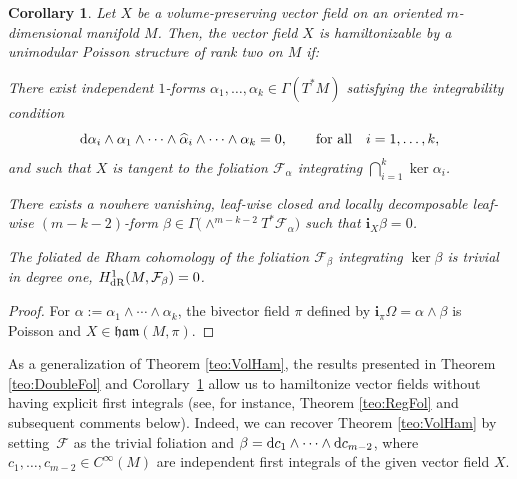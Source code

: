 \documentclass[10pt,a4paper]{amsart}
\newcommand{\dd}{{\rm d}}
\newcommand{\ii}{\mathbf{i}}
\numberwithin{equation}{section}
\newtheorem{Corollary}[Theorem]{Corollary}
\begin{document}
\begin{Corollary}\label{cor:DoubleFol}
Let $X$ be a volume-preserving vector field on an oriented $m$-dimensional mani\-fold $M$. Then, the vector field $X$ is hamiltonizable by a unimodular Poisson structure of rank two on $M$ if:
 \begin{enumerate}\itemsep=0pt
 \item[$1.$] There exist independent $1$-forms $\alpha_1,\dots,\alpha_k\in\Gamma(T^{*}M)$ satisfying the integrability condition
 \begin{equation*}%
 \dd\alpha_{i} \wedge \alpha_{1} \wedge \cdots \wedge \widehat{\alpha}_{i} \wedge \cdots \wedge \alpha_{k} = 0, \qquad \text{for all}\quad i=1,\dots,k,
 \end{equation*}
 and such that $X$ is tangent to the foliation $\mathcal{F}_{\alpha}$ integrating $\bigcap_{i=1}^{k}\ker\alpha_{i}$.
{\sloppy \item [$2.$] There exists a nowhere vanishing, leaf-wise closed and locally decomposable leaf-wise $(m-k-2)$-form $\beta \in \Gamma\big({\wedge}^{m-k-2}T^{*}\mathcal{F}_{\alpha}\big)$ such that $\ii_{X}\beta = 0$.

}

 \item[$3.$] The foliated de Rham cohomology of the foliation $\mathcal{F}_{\beta}$ integrating $\ker\beta$ is trivial in degree one, $H^{1}_{{\rm dR}}(M,\mathcal{F}_{\beta})=0$.
 \end{enumerate}
\end{Corollary}
\begin{proof}
For $\alpha := \alpha_1 \wedge \cdots \wedge \alpha_k$, the bivector field $\pi$ defined by $\ii_{\pi}\Omega = \alpha\wedge\beta$
is Poisson and $X \in \mathfrak{ham}(M,\pi)$.
\end{proof}

As a generalization of Theorem \ref{teo:VolHam}, the results presented in Theorem \ref{teo:DoubleFol} and Corollary~\ref{cor:DoubleFol} allow us to hamiltonize vector fields without having explicit first integrals (see, for ins\-tance, Theorem \ref{teo:RegFol} and subsequent comments below). Indeed, we can recover Theorem \ref{teo:VolHam} by setting~$\mathcal{F}$ as the trivial foliation and $\beta = \dd c_1 \wedge \cdots \wedge \dd c_{m-2}$, where $c_1, \dots, c_{m-2} \in C^{\infty}(M)$ are independent first integrals of the given vector field $X$.
\end{document}
